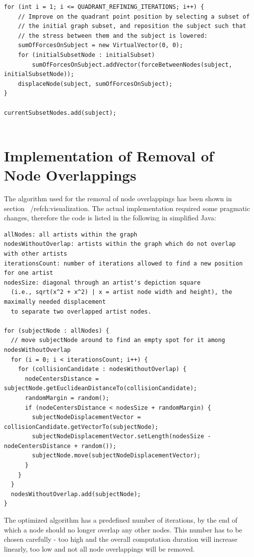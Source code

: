 \begin{verbatim}
for (int i = 1; i <= QUADRANT_REFINING_ITERATIONS; i++) {
    // Improve on the quadrant point position by selecting a subset of
    // the initial graph subset, and reposition the subject such that
    // the stress between them and the subject is lowered:
    sumOfForcesOnSubject = new VirtualVector(0, 0);
    for (initialSubsetNode : initialSubset)
        sumOfForcesOnSubject.addVector(forceBetweenNodes(subject, initialSubsetNode));
    displaceNode(subject, sumOfForcesOnSubject);
}

currentSubsetNodes.add(subject);
	
\end{verbatim}

\section{Implementation of Removal of Node Overlappings}
\label{subch:implementation-overlapping}

The algorithm used for the removal of node overlappings has been shown in section ~/ref{ch:visualization}. The actual implementation required some pragmatic changes, therefore the code is listed in the following in simplified Java:

\begin{verbatim}
allNodes: all artists within the graph
nodesWithoutOverlap: artists within the graph which do not overlap with other artists
iterationsCount: number of iterations allowed to find a new position for one artist
nodesSize: diagonal through an artist's depiction square 
  (i.e., sqrt(x^2 + x^2) | x = artist node width and height), the maximally needed displacement
  to separate two overlapped artist nodes.
	
for (subjectNode : allNodes) {
  // move subjectNode around to find an empty spot for it among nodesWithoutOverlap
  for (i = 0; i < iterationsCount; i++) {
    for (collisionCandidate : nodesWithoutOverlap) {
      nodeCentersDistance = subjectNode.getEuclideanDistanceTo(collisionCandidate);
      randomMargin = random();
      if (nodeCentersDistance < nodesSize + randomMargin) {
        subjectNodeDisplacementVector = collisionCandidate.getVectorTo(subjectNode);
        subjectNodeDisplacementVector.setLength(nodesSize - nodeCentersDistance + random()); 
        subjectNode.move(subjectNodeDisplacementVector);
      }
    }
  }
  nodesWithoutOverlap.add(subjectNode);
}
\end{verbatim}

The optimized algorithm has a predefined number of iterations, by the end of which a node should no longer overlap any other nodes. This number has to be chosen carefully - too high and the overall computation duration will increase linearly, too low and not all node overlappings will be removed.

